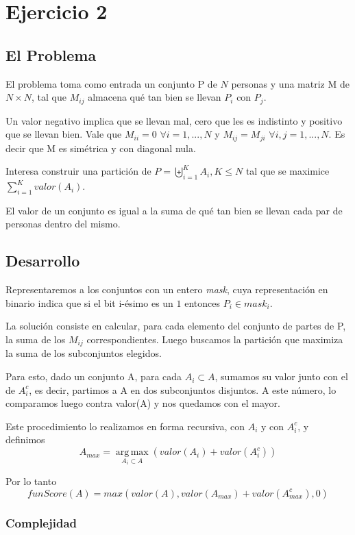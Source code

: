 \section{Ejercicio 2}

\subsection{El Problema}

El problema toma como entrada un conjunto P de $N$ personas y una matriz M de $N \times N$, tal que $M_{ij}$ almacena qu\'e tan bien se llevan $P_i$ con $P_j$.

Un valor negativo implica que se llevan mal, cero que les es indistinto y positivo que se llevan bien. Vale que $M_{ii} = 0$ $\forall i = 1,...,N$ y $M_{ij} = M_{ji}$  $\forall i,j = 1,...,N$. Es decir que M es sim\'etrica y con diagonal nula. 

Interesa construir una partici\'on de $P = \biguplus\limits_{i = 1}^{K} A_i, K \leq N$ tal que se maximice $\displaystyle\sum_{i = 1}^{K} valor(A_i)$.

El valor de un conjunto es igual a la suma de qu\'e tan bien se llevan cada par de personas dentro del mismo.

\subsection{Desarrollo}

Representaremos a los conjuntos con un entero \textit{mask}, cuya representaci\'on en binario indica que si el bit i-\'esimo es un $1$ entonces $P_i \in mask_i$.

La soluci\'on consiste en calcular, para cada elemento del conjunto de partes de P, la suma de los $M_{ij}$ correspondientes. Luego buscamos la partici\'on que maximiza la suma de los subconjuntos elegidos.

Para esto, dado un conjunto A, para cada $A_i \subset  A$, sumamos su valor junto con el de $A_i^c$, es decir, partimos a A en dos subconjuntos disjuntos. A este n\'umero, lo comparamos luego contra valor(A) y nos quedamos con el mayor.

Este procedimiento lo realizamos en forma recursiva, con $A_i$ y con $A_i^c$, y definimos \[A_{max}=\operatorname*{arg\,max}_{A_i \subset  A} (valor(A_i) + valor(A_i^c))\]

Por lo tanto \[funScore(A) = max(valor(A), valor(A_{max}) + valor(A_{max}^c), 0)\]


\subsubsection{Complejidad}

